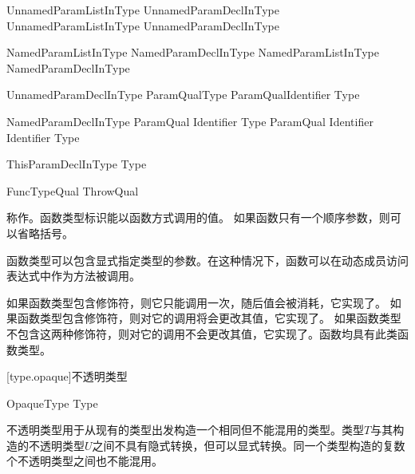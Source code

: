 \begin{bnf}{UnnamedParamListInType}
    UnnamedParamDeclInType \br
    UnnamedParamListInType \terminal{,} UnnamedParamDeclInType
\end{bnf}

\begin{bnf}{NamedParamListInType}
    NamedParamDeclInType \br
    NamedParamListInType \terminal{,} NamedParamDeclInType
\end{bnf}

\begin{bnf}{UnnamedParamDeclInType}
    ParamQual\bnfq Type \br
    ParamQual\bnfq Identifier \terminal{:} Type\bnfq
\end{bnf}

\begin{bnf}{NamedParamDeclInType}
    ParamQual\bnfq \terminal{(} Identifier \terminal{)} Type\bnfq \br
    ParamQual\bnfq \terminal{(} Identifier \terminal{)} Identifier \terminal{:} Type\bnfq
\end{bnf}

\begin{bnf}{ThisParamDeclInType}
     \terminal{:} Type
\end{bnf}

\begin{bnf}{FuncTypeQual}
    ThrowQual \br
     \br
     \br
     \br
\end{bnf}

\pnum
{}称作。函数类型标识能以函数方式调用的值。
如果函数只有一个顺序参数，则可以省略括号。

\pnum
函数类型可以包含显式指定类型的参数。在这种情况下，函数可以在动态成员访问表达式中作为方法被调用。

\pnum
如果函数类型包含修饰符，则它只能调用一次，随后值会被消耗，它实现了。
如果函数类型包含修饰符，则对它的调用将会更改其值，它实现了。
如果函数类型不包含这两种修饰符，则对它的调用不会更改其值，它实现了。函数均具有此类函数类型。

[type.opaque]{不透明类型}

\begin{bnf}{OpaqueType}
     Type
\end{bnf}

\pnum
不透明类型用于从现有的类型出发构造一个相同但不能混用的类型。类型$T$与其构造的不透明类型$U$之间不具有隐式转换，但可以显式转换。同一个类型构造的复数个不透明类型之间也不能混用。

